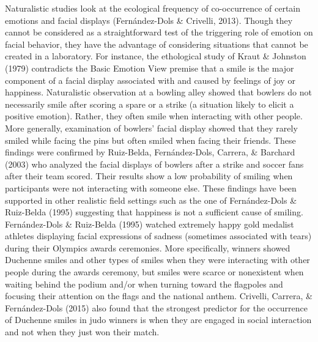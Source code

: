 \documentclass[
  english,
  doc]{apa7}
\begin{document}
Naturalistic studies look at the ecological frequency of co-occurrence of certain emotions and facial displays (Fernández-Dols \& Crivelli, 2013). Though they cannot be considered as a straightforward test of the triggering role of emotion on facial behavior, they have the advantage of considering situations that cannot be created in a laboratory. For instance, the ethological study of Kraut \& Johnston (1979) contradicts the Basic Emotion View premise that a smile is the major component of a facial display associated with and caused by feelings of joy or happiness. Naturalistic observation at a bowling alley showed that bowlers do not necessarily smile after scoring a spare or a strike (a situation likely to elicit a positive emotion). Rather, they often smile when interacting with other people. More generally, examination of bowlers' facial display showed that they rarely smiled while facing the pins but often smiled when facing their friends. These findings were confirmed by Ruiz-Belda, Fernández-Dols, Carrera, \& Barchard (2003) who analyzed the facial displays of bowlers after a strike and soccer fans after their team scored. Their results show a low probability of smiling when participants were not interacting with someone else. These findings have been supported in other realistic field settings such as the one of Fernández-Dols \& Ruiz-Belda (1995) suggesting that happiness is not a sufficient cause of smiling. Fernández-Dols \& Ruiz-Belda (1995) watched extremely happy gold medalist athletes displaying facial expressions of sadness (sometimes associated with tears) during their Olympics awards ceremonies. More specifically, winners showed Duchenne smiles and other types of smiles when they were interacting with other people during the awards ceremony, but smiles were scarce or nonexistent when waiting behind the podium and/or when turning toward the flagpoles and focusing their attention on the flags and the national anthem. Crivelli, Carrera, \& Fernández-Dols (2015) also found that the strongest predictor for the occurrence of Duchenne smiles in judo winners is when they are engaged in social interaction and not when they just won their match.
\end{document}
